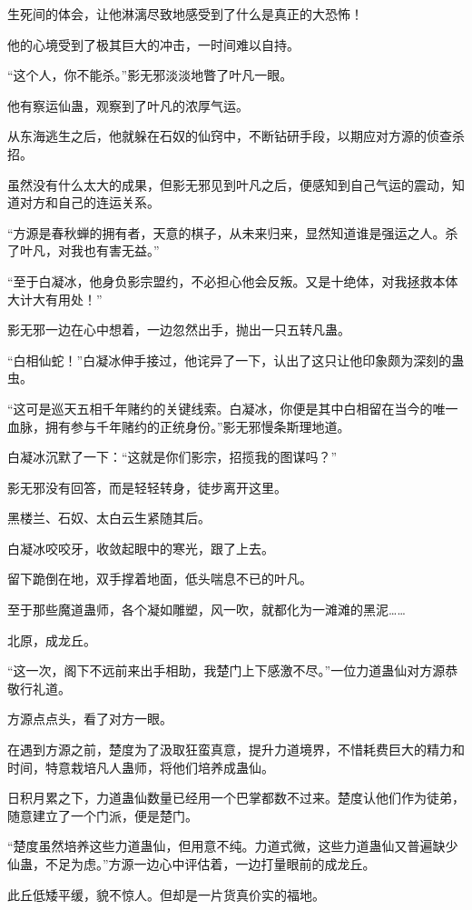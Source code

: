 \begin{this_body}
生死间的体会，让他淋漓尽致地感受到了什么是真正的大恐怖！

他的心境受到了极其巨大的冲击，一时间难以自持。

“这个人，你不能杀。”影无邪淡淡地瞥了叶凡一眼。

他有察运仙蛊，观察到了叶凡的浓厚气运。

从东海逃生之后，他就躲在石奴的仙窍中，不断钻研手段，以期应对方源的侦查杀招。

虽然没有什么太大的成果，但影无邪见到叶凡之后，便感知到自己气运的震动，知道对方和自己的连运关系。

“方源是春秋蝉的拥有者，天意的棋子，从未来归来，显然知道谁是强运之人。杀了叶凡，对我也有害无益。”

“至于白凝冰，他身负影宗盟约，不必担心他会反叛。又是十绝体，对我拯救本体大计大有用处！”

影无邪一边在心中想着，一边忽然出手，抛出一只五转凡蛊。

“白相仙蛇！”白凝冰伸手接过，他诧异了一下，认出了这只让他印象颇为深刻的蛊虫。

“这可是巡天五相千年赌约的关键线索。白凝冰，你便是其中白相留在当今的唯一血脉，拥有参与千年赌约的正统身份。”影无邪慢条斯理地道。

白凝冰沉默了一下：“这就是你们影宗，招揽我的图谋吗？”

影无邪没有回答，而是轻轻转身，徒步离开这里。

黑楼兰、石奴、太白云生紧随其后。

白凝冰咬咬牙，收敛起眼中的寒光，跟了上去。

留下跪倒在地，双手撑着地面，低头喘息不已的叶凡。

至于那些魔道蛊师，各个凝如雕塑，风一吹，就都化为一滩滩的黑泥……

北原，成龙丘。

“这一次，阁下不远前来出手相助，我楚门上下感激不尽。”一位力道蛊仙对方源恭敬行礼道。

方源点点头，看了对方一眼。

在遇到方源之前，楚度为了汲取狂蛮真意，提升力道境界，不惜耗费巨大的精力和时间，特意栽培凡人蛊师，将他们培养成蛊仙。

日积月累之下，力道蛊仙数量已经用一个巴掌都数不过来。楚度认他们作为徒弟，随意建立了一个门派，便是楚门。

“楚度虽然培养这些力道蛊仙，但用意不纯。力道式微，这些力道蛊仙又普遍缺少仙蛊，不足为虑。”方源一边心中评估着，一边打量眼前的成龙丘。

此丘低矮平缓，貌不惊人。但却是一片货真价实的福地。


\end{this_body}
